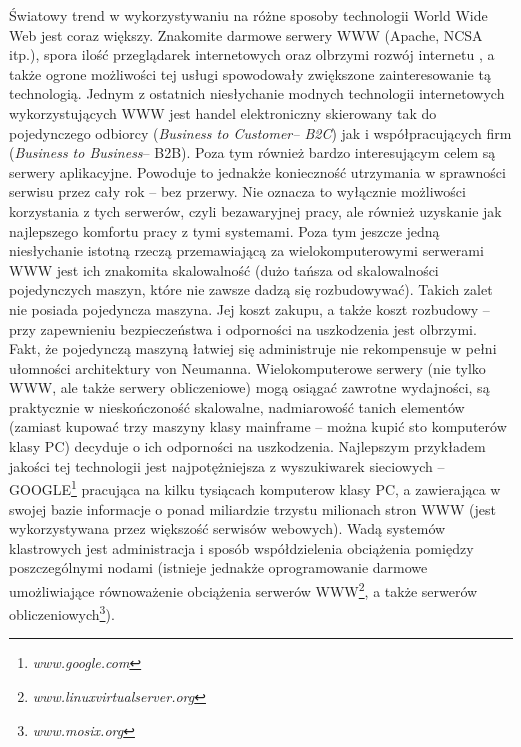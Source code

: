 Światowy trend w wykorzystywaniu na różne sposoby technologii World Wide Web jest coraz większy.
Znakomite darmowe serwery WWW (Apache, NCSA itp.), spora ilość przeglądarek internetowych
oraz olbrzymi rozwój internetu \cite{siecikomputerowe}, a także ogrone możliwości tej usługi spowodowały zwiększone 
zainteresowanie tą technologią.
Jednym z ostatnich niesłychanie modnych technologii internetowych wykorzystujących WWW jest handel 
elektroniczny skierowany tak do pojedynczego odbiorcy (\emph{Business to Customer-- B2C}) jak i współpracujących
firm (\emph{Business to Business}-- B2B). Poza tym również bardzo interesującym celem są serwery aplikacyjne.
Powoduje to jednakże konieczność utrzymania w sprawności serwisu przez cały rok -- bez 
przerwy. Nie oznacza to wyłącznie możliwości korzystania z tych serwerów, czyli bezawaryjnej pracy, ale również
uzyskanie jak najlepszego komfortu pracy z tymi systemami. Poza tym jeszcze jedną niesłychanie istotną rzeczą
przemawiającą za wielokomputerowymi serwerami WWW jest ich znakomita skalowalność (dużo tańsza od skalowalności
pojedynczych maszyn, które nie zawsze dadzą się rozbudowywać). Takich zalet nie posiada pojedyncza maszyna. Jej koszt zakupu, 
a także koszt rozbudowy -- przy zapewnieniu bezpieczeństwa i odporności na uszkodzenia jest olbrzymi. Fakt, że pojedynczą
maszyną łatwiej się administruje nie rekompensuje w pełni ułomności architektury von Neumanna. Wielokomputerowe serwery
(nie tylko WWW, ale także serwery obliczeniowe) mogą osiągać zawrotne wydajności, są praktycznie w nieskończoność skalowalne,
nadmiarowość tanich elementów (zamiast kupować trzy maszyny klasy mainframe -- można kupić sto komputerów klasy PC) decyduje
o ich odporności na uszkodzenia. Najlepszym przykładem jakości tej technologii jest najpotężniejsza z wyszukiwarek sieciowych --
GOOGLE\footnote{\emph{www.google.com}} pracująca na kilku tysiącach komputerow klasy PC, a zawierająca w swojej bazie informacje 
o ponad miliardzie trzystu milionach stron WWW (jest wykorzystywana przez większość serwisów webowych). Wadą
systemów klastrowych jest administracja i sposób współdzielenia obciążenia pomiędzy poszczególnymi nodami (istnieje jednakże
oprogramowanie darmowe umożliwiające równoważenie obciążenia serwerów WWW\footnote{\emph{www.linuxvirtualserver.org}}, a 
także serwerów obliczeniowych\footnote{\emph{www.mosix.org}}).

